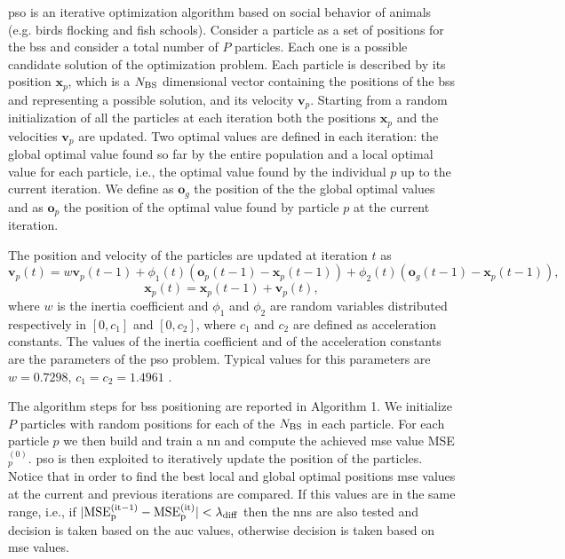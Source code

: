 \documentclass[draftcls,onecolumn,12pt]{IEEEtran}
\begin{document}
\ac{pso} is an iterative optimization algorithm based on social behavior of animals (e.g. birds flocking and fish schools). Consider a particle as a set of positions for the \acp{bs} and consider a total number of $P$ particles. Each one is a possible candidate solution of the optimization problem. Each particle is described by its position $\bm{x}_p$, which is a $N_{\rm BS}$ dimensional vector containing the positions of the \acp{bs} and representing a possible solution, and its velocity $\bm{v}_p$.
Starting from a random initialization of all the particles at each iteration both the positions $\bm{x}_p$ and the velocities $\bm{v}_p$ are updated. Two optimal values are defined in each iteration: the global optimal value found so far by the entire population and a local optimal value for each particle, i.e., the optimal value found by the individual $p$ up to the current iteration. We define as $\bm{o}_g$ the position of the the global optimal values and as $\bm{o}_p$ the position of the optimal value found by particle $p$ at the current iteration.

The position and velocity of the particles are updated at iteration $t$ as
 \begin{equation}\label{eq: v up}
 \bm{v}_p(t) = w\bm{v}_p(t-1)+\phi_1(t)(\bm{o}_p(t-1)-\bm{x}_p(t-1))+\phi_2(t)(\bm{o}_g(t-1)-\bm{x}_p(t-1)), 
 \end{equation}
 \begin{equation}\label{eq: p up}
 \bm{x}_p(t) = \bm{x}_p(t-1) + \bm{v}_p(t),
 \end{equation}
where $w$ is the inertia coefficient and $\phi_1$ and $\phi_2$ are random variables distributed respectively in $[0,c_1]$ and $[0,c_2]$, where $c_1$ and $c_2$ are defined as acceleration constants. The values of the inertia coefficient and of the acceleration constants are the parameters of the \ac{pso} problem. Typical values for this parameters are $w=0.7298$, $c_1=c_2=1.4961$ \cite{Kennedy-11}.

The algorithm steps for \acp{bs} positioning are reported in Algorithm 1. We initialize $P$ particles with random positions for each of the $N_{\rm BS}$ in each particle. For each particle $p$ we then build and train a \ac{nn} and compute the achieved \ac{mse} value MSE$_p^{(0)}$. \ac{pso} is then exploited to iteratively update the position of the particles. Notice that in order to find the best local and global optimal positions \ac{mse} values at the current and previous iterations are compared. If this values are in the same range, i.e., if $|\rm{MSE}_p^{(it-1)}-\rm{MSE}_p^{(it)}|<\lambda_{\rm diff}$ then the \acp{nn}  are also tested and decision is taken based on the \ac{auc} values, otherwise decision is taken based on \ac{mse} values.
\end{document}
